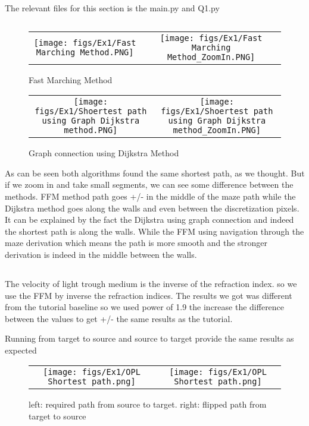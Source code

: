 \\
The relevant files for this section is the main.py and Q1.py

\subsection{}
\begin{figure*}[h!]
\centering
\begin{tabular}{cc}
    \texttt{[image: figs/Ex1/Fast Marching Method.PNG]} &
    \texttt{[image: figs/Ex1/Fast Marching Method\_ZoomIn.PNG]} 
\end{tabular}
\caption{\small Fast Marching Method}
 \label{fig:fmm}
\end{figure*}

\begin{figure*}[h!]
\centering
\begin{tabular}{cc}
    \texttt{[image: figs/Ex1/Shoertest path using Graph Dijkstra method.PNG]} &
    \texttt{[image: figs/Ex1/Shoertest path using Graph Dijkstra method\_ZoomIn.PNG]} 
\end{tabular}
\caption{\small Graph connection using Dijkstra Method}
 \label{fig:dijkstra}
\end{figure*}
As can be seen both algorithms found the same shortest path, as we thought. But if we zoom in and take small segments, we can see some difference between the methods. FFM method path goes +/- in the middle of the maze path while the Dijkstra method goes along the walls and even between the discretization pixels. It can be explained by the fact the Dijkstra using graph connection and indeed the shortest path is along the walls. While the FFM using navigation through the maze derivation which means the path is more smooth and the stronger derivation is indeed in the middle between the walls.
\subsection{}
The velocity of light trough medium is the inverse of the refraction index. so we use the FFM by inverse the refraction indices. The results we got was different from the tutorial baseline so we used power of 1.9 the increase the difference between the values to get +/- the same results as the tutorial.

Running from target to source and source to target provide the same results as expected
\begin{figure*}[h!]
\centering
\begin{tabular}{cc}
    \texttt{[image: figs/Ex1/OPL Shortest path.png]} &
    \texttt{[image: figs/Ex1/OPL Shortest path.png]}
\end{tabular}
\caption{\small left: required path from source to target. right: flipped path from target to source}
\label{fig:OPL}
\end{figure*}

